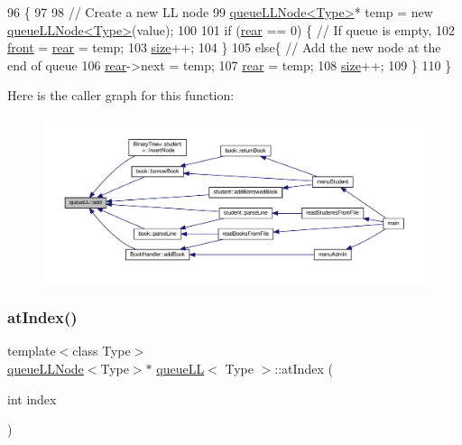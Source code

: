 \begin{DoxyCode}
96                            \{
97 
98         \textcolor{comment}{// Create a new LL node}
99         \hyperlink{classqueue_l_l_node}{queueLLNode<Type>}* temp = \textcolor{keyword}{new} \hyperlink{classqueue_l_l_node}{queueLLNode<Type>}(value);
100 
101         \textcolor{keywordflow}{if} (\hyperlink{classqueue_l_l_aab0540567095f05fb1c981a2e7e4e93e}{rear} == 0) \{    \textcolor{comment}{// If queue is empty,}
102             \hyperlink{classqueue_l_l_a622ea439d113fe8e4616320ec2346d8b}{front} = \hyperlink{classqueue_l_l_aab0540567095f05fb1c981a2e7e4e93e}{rear} = temp;
103             \hyperlink{classqueue_l_l_af2ae538d6971624f1c8404d3a8502aa0}{size}++;
104         \}
105         \textcolor{keywordflow}{else}\{   \textcolor{comment}{// Add the new node at the end of queue}
106             \hyperlink{classqueue_l_l_aab0540567095f05fb1c981a2e7e4e93e}{rear}->next = temp;
107             \hyperlink{classqueue_l_l_aab0540567095f05fb1c981a2e7e4e93e}{rear} = temp;
108             \hyperlink{classqueue_l_l_af2ae538d6971624f1c8404d3a8502aa0}{size}++;
109         \}
110     \}
\end{DoxyCode}
Here is the caller graph for this function\+:
\nopagebreak
\begin{figure}[H]
\begin{center}
\leavevmode
\includegraphics[width=350pt]{classqueue_l_l_adcbcc26433da2c9d17b6cf0802d1d7d2_icgraph}
\end{center}
\end{figure}
\mbox{\label{classqueue_l_l_a6c8873be0f08b3b2e83a24469fbfaa5d}} 
\subsubsection{\texorpdfstring{at\+Index()}{atIndex()}}
{\footnotesize\ttfamily template$<$class Type$>$ \\
\hyperlink{classqueue_l_l_node}{queue\+L\+L\+Node}$<$Type$>$$\ast$ \hyperlink{classqueue_l_l}{queue\+LL}$<$ Type $>$\+::at\+Index (\begin{DoxyParamCaption}\item[{int}]{index }\end{DoxyParamCaption})\hspace{0.3cm}{\ttfamily [inline]}}

